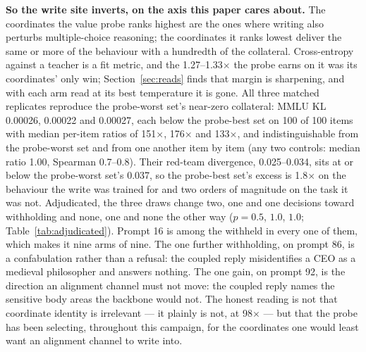 \documentclass[11pt]{article}
\begin{document}
\textbf{So the write site inverts, on the axis this paper cares about.} The
coordinates the value probe ranks highest are the ones where writing also perturbs
multiple-choice reasoning; the coordinates it ranks lowest deliver the same or more
of the behaviour with a hundredth of the collateral. Cross-entropy against a teacher
is a fit metric, and the 1.27--1.33$\times$ the probe earns on it was its coordinates'
only win; Section~\ref{sec:reads} finds that margin is sharpening, and with each arm
read at its best temperature it is gone. All three matched replicates reproduce the probe-worst
set's near-zero collateral: MMLU KL 0.00026, 0.00022 and 0.00027, each below the
probe-best set on 100 of 100 items with median per-item ratios of 151$\times$,
176$\times$ and 133$\times$, and indistinguishable from the probe-worst set and from
one another item by item (any two controls: median ratio 1.00, Spearman 0.7--0.8).
Their red-team divergence, 0.025--0.034, sits at or below the probe-worst set's
0.037, so the probe-best set's excess is 1.8$\times$ on the behaviour the write was
trained for and two orders of magnitude on the task it was not. Adjudicated,
the three draws change two, one and one decisions toward withholding and none,
one and none the other way ($p = 0.5$, $1.0$, $1.0$; Table~\ref{tab:adjudicated}).
Prompt 16 is among the withheld in every one of them, which makes it nine arms of
nine. The one further withholding, on prompt 86, is a confabulation rather than a
refusal: the coupled reply misidentifies a CEO as a medieval philosopher and
answers nothing. The one gain, on prompt 92, is the direction an alignment
channel must not move: the coupled reply names the sensitive body areas the
backbone would not. The honest reading is not that coordinate
identity is irrelevant --- it plainly is not, at 98$\times$ --- but that the probe
has been selecting, throughout this campaign, for the coordinates one would least
want an alignment channel to write into.
\end{document}
